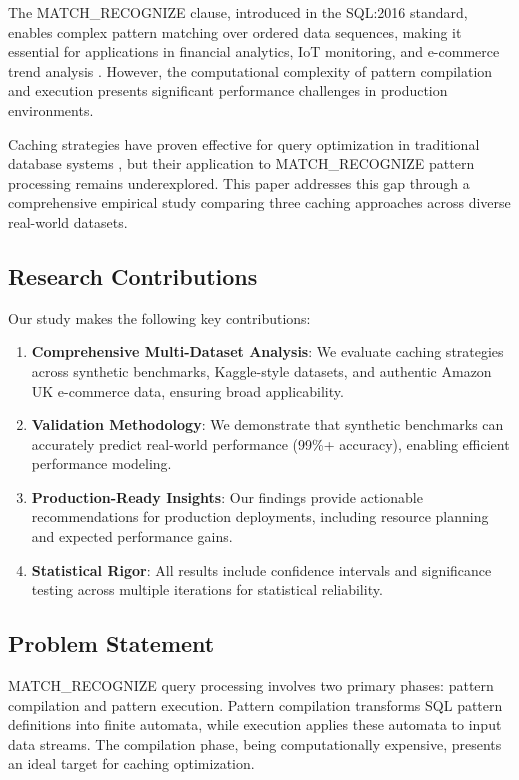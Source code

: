 \documentclass[conference]{IEEEtran}
\begin{document}
The MATCH\_RECOGNIZE clause, introduced in the SQL:2016 standard, enables complex pattern matching over ordered data sequences, making it essential for applications in financial analytics, IoT monitoring, and e-commerce trend analysis \cite{sql2016standard}. However, the computational complexity of pattern compilation and execution presents significant performance challenges in production environments.

Caching strategies have proven effective for query optimization in traditional database systems \cite{cache_survey}, but their application to MATCH\_RECOGNIZE pattern processing remains underexplored. This paper addresses this gap through a comprehensive empirical study comparing three caching approaches across diverse real-world datasets.

\subsection{Research Contributions}

Our study makes the following key contributions:

\begin{enumerate}
\item \textbf{Comprehensive Multi-Dataset Analysis}: We evaluate caching strategies across synthetic benchmarks, Kaggle-style datasets, and authentic Amazon UK e-commerce data, ensuring broad applicability.

\item \textbf{Validation Methodology}: We demonstrate that synthetic benchmarks can accurately predict real-world performance (99\%+ accuracy), enabling efficient performance modeling.

\item \textbf{Production-Ready Insights}: Our findings provide actionable recommendations for production deployments, including resource planning and expected performance gains.

\item \textbf{Statistical Rigor}: All results include confidence intervals and significance testing across multiple iterations for statistical reliability.
\end{enumerate}

\subsection{Problem Statement}

MATCH\_RECOGNIZE query processing involves two primary phases: pattern compilation and pattern execution. Pattern compilation transforms SQL pattern definitions into finite automata, while execution applies these automata to input data streams. The compilation phase, being computationally expensive, presents an ideal target for caching optimization.
\end{document}
